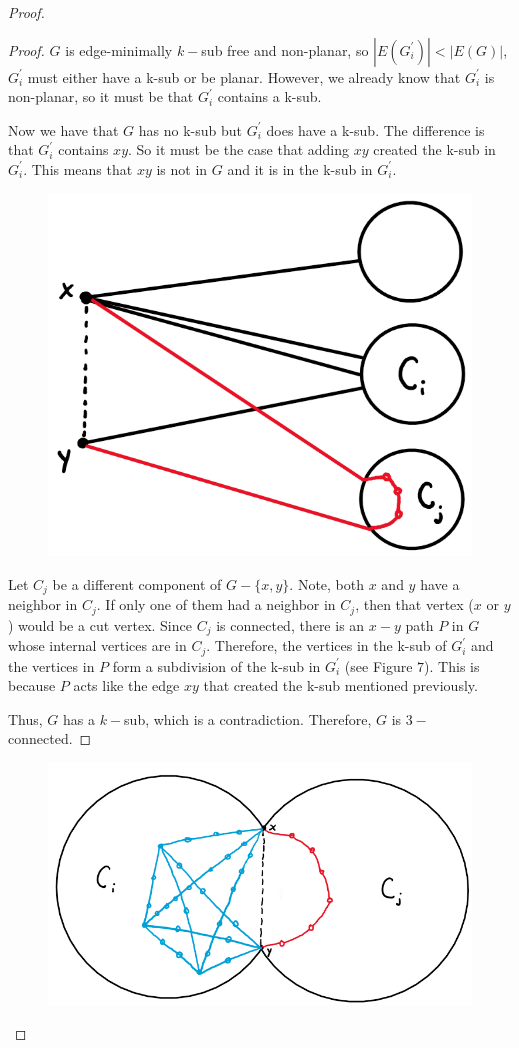 \documentclass[12pt]{article}
\theoremstyle{definition}
\begin{document}
\begin{proof}
\begin{proof}
    $G$ is edge-minimally $k-$sub free and non-planar, so $|E(G_i^{\prime})| < |E(G)|$, $G_i^{\prime}$ must either have a k-sub or be planar. However, we already know that $G_i^{\prime}$ is non-planar, so it must be that $G_i^{\prime}$ contains a k-sub.

    Now we have that $G$ has no k-sub but $G_i^{\prime}$ does have a k-sub. The difference is that $G_i^{\prime}$ contains $xy$. So it must be the case that adding $xy$ created the k-sub in $G_i^{\prime}$. This means that $xy$ is not in $G$ and it is in the k-sub in $G_i^{\prime}$.
    \begin{figure}[hbt!]
        \centering
        \includegraphics[width=0.35\linewidth]{graphs/k_sub_xy.png}
        \caption{}
    \end{figure}

    Let $C_j$ be a different component of $G - \{x,y\}$.  Note, both $x$ and $y$ have a neighbor in $C_j$. If only one of them had a neighbor in $C_j$, then that vertex ($x$ or $y$) would be a cut vertex.
    Since $C_j$ is connected, there is an $x-y$ path $P$ in $G$ whose internal vertices are in $C_j$. Therefore, the vertices in the k-sub of $G_i^{\prime}$ and the vertices in $P$ form a subdivision of the k-sub in $G_i^{\prime}$ (see Figure $7$). This is because $P$ acts like the edge $xy$ that created the k-sub mentioned previously.

    Thus, $G$ has a $k-$sub, which is a contradiction. Therefore, $G$ is $3-$connected.

\end{proof}

\begin{figure}[hbt!]
    \centering
    \includegraphics[width=0.50\linewidth]{graphs/k_sub_i_j.png}
    \caption{}
\end{figure}


\end{proof}
\end{document}
